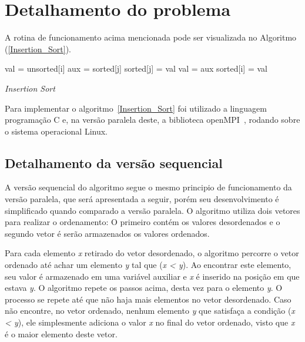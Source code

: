 \documentclass[portuguese, conference]{IEEEtran}
\begin{document}
\section{Detalhamento do problema}

A rotina de funcionamento acima mencionada pode ser visualizada no Algoritmo (\ref{Insertion_Sort}).

\begin{algorithm}[ht]
\label{Insertion_Sort}
     {
        val = unsorted[i]\;
         {
             {
                aux = sorted[j]\;
                sorted[j] = val\;
                val = aux\;
            }
        }
        sorted[i] = val\;
    }
\caption{{\it Insertion Sort}}
\end{algorithm}

Para implementar o algoritmo~\ref{Insertion_Sort} foi utilizado a linguagem programação C e, na versão paralela deste, a biblioteca openMPI~\cite{HAM13}, rodando sobre o sistema operacional Linux.

\subsection{Detalhamento da versão sequencial}
A versão sequencial do algoritmo segue o mesmo principio de funcionamento da versão paralela, que será apresentada a seguir, porém seu desenvolvimento é simplificado quando comparado a versão paralela. O algoritmo utiliza dois vetores para realizar o ordenamento: O primeiro contém os valores desordenados e o segundo vetor é serão armazenados os valores ordenados.

Para cada elemento {\it x} retirado do vetor desordenado, o algoritmo percorre o vetor ordenado até achar um elemento {\it y} tal que ({\it x < y}). Ao encontrar este elemento, seu valor é armazenado em uma variável auxiliar e {\it x} é inserido na posição em que estava {\it y}. O algoritmo repete os passos acima, desta vez para o elemento {\it y}. O processo se repete até que não haja mais elementos no vetor desordenado. Caso não encontre, no vetor ordenado, nenhum elemento {\it y} que satisfaça a condição ({\it x < y}), ele simplesmente adiciona o valor {\it x} no final do vetor ordenado, visto que {\it x} é o maior elemento deste vetor.
\end{document}
